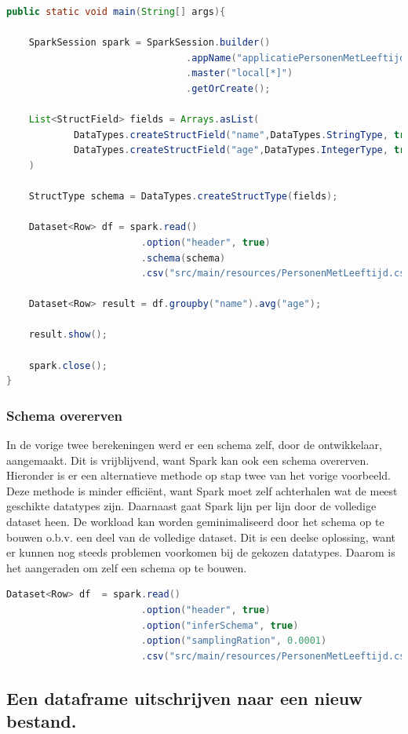 \documentclass[a4paper,10pt,twoside]{report}
\begin{document}
\begin{lstlisting}[language=Java]
public static void main(String[] args){
	
	SparkSession spark = SparkSession.builder()
								.appName("applicatiePersonenMetLeeftijd")
								.master("local[*]")
								.getOrCreate();
								
	List<StructField> fields = Arrays.asList(
			DataTypes.createStructField("name",DataTypes.StringType, true),
			DataTypes.createStructField("age",DataTypes.IntegerType, true);
	)
	
	StructType schema = DataTypes.createStructType(fields);
	
	Dataset<Row> df = spark.read()
						.option("header", true)
						.schema(schema)
						.csv("src/main/resources/PersonenMetLeeftijd.csv");
	
	Dataset<Row> result = df.groupby("name").avg("age");
	
	result.show();
	
	spark.close();
}
\end{lstlisting}

\subsubsection{Schema overerven}

In de vorige twee berekeningen werd er een schema zelf, door de ontwikkelaar, aangemaakt. Dit is vrijblijvend, want Spark kan ook een schema overerven. Hieronder is er een alternatieve methode op stap twee van het vorige voorbeeld. Deze methode is minder efficiënt, want Spark moet zelf achterhalen wat de meest geschikte datatypes zijn. Daarnaast gaat Spark lijn per lijn door de volledige dataset heen. De workload kan worden geminimaliseerd door het schema op te bouwen o.b.v. een deel van de volledige dataset. Dit is een deelse oplossing, want er kunnen nog steeds problemen voorkomen bij de gekozen datatypes. Daarom is het aangeraden om zelf een schema op te bouwen.

\begin{lstlisting}[language=Java]
Dataset<Row> df  = spark.read()
						.option("header", true)
						.option("inferSchema", true)
						.option("samplingRation", 0.0001)
						.csv("src/main/resources/PersonenMetLeeftijd.csv)
\end{lstlisting}

\subsection{Een dataframe uitschrijven naar een nieuw bestand.}
\end{document}
